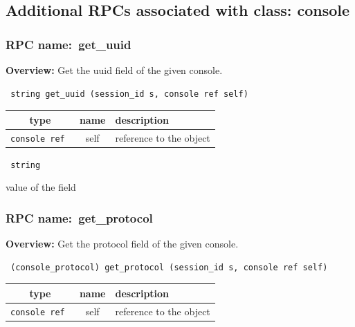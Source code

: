 \subsection{Additional RPCs associated with class: console}
\subsubsection{RPC name:~get\_uuid}

{\bf Overview:} 
Get the uuid field of the given console.

\begin{verbatim} string get_uuid (session_id s, console ref self)\end{verbatim}



 
\vspace{0.3cm}
\begin{tabular}{|c|c|p{7cm}|}
 \hline
{\bf type} & {\bf name} & {\bf description} \\ \hline
{\tt console ref } & self & reference to the object \\ \hline 

\end{tabular}

\vspace{0.3cm}

{\tt 
string
}


value of the field
\vspace{0.3cm}
\vspace{0.3cm}
\vspace{0.3cm}
\subsubsection{RPC name:~get\_protocol}

{\bf Overview:} 
Get the protocol field of the given console.

\begin{verbatim} (console_protocol) get_protocol (session_id s, console ref self)\end{verbatim}



 
\vspace{0.3cm}
\begin{tabular}{|c|c|p{7cm}|}
 \hline
{\bf type} & {\bf name} & {\bf description} \\ \hline
{\tt console ref } & self & reference to the object \\ \hline 

\end{tabular}

